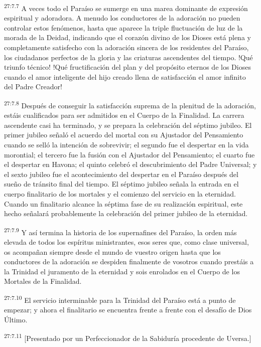 \par
\textsuperscript{27:7.7} A veces todo el Paraíso se sumerge en una marea dominante de expresión espiritual y adoradora. A menudo los conductores de la adoración no pueden controlar estos fenómenos, hasta que aparece la triple fluctuación de luz de la morada de la Deidad, indicando que el corazón divino de los Dioses está plena y completamente satisfecho con la adoración sincera de los residentes del Paraíso, los ciudadanos perfectos de la gloria y las criaturas ascendentes del tiempo. !Qué triunfo técnico! !Qué fructificación del plan y del propósito eternos de los Dioses cuando el amor inteligente del hijo creado llena de satisfacción el amor infinito del Padre Creador!

\par
\textsuperscript{27:7.8} Después de conseguir la satisfacción suprema de la plenitud de la adoración, estáis cualificados para ser admitidos en el Cuerpo de la Finalidad. La carrera ascendente casi ha terminado, y se prepara la celebración del séptimo jubileo. El primer jubileo señaló el acuerdo del mortal con su Ajustador del Pensamiento cuando se selló la intención de sobrevivir; el segundo fue el despertar en la vida morontial; el tercero fue la fusión con el Ajustador del Pensamiento; el cuarto fue el despertar en Havona; el quinto celebró el descubrimiento del Padre Universal; y el sexto jubileo fue el acontecimiento del despertar en el Paraíso después del sueño de tránsito final del tiempo. El séptimo jubileo señala la entrada en el cuerpo finalitario de los mortales y el comienzo del servicio en la eternidad. Cuando un finalitario alcance la séptima fase de su realización espiritual, este hecho señalará probablemente la celebración del primer jubileo de la eternidad.

\par
\textsuperscript{27:7.9} Y así termina la historia de los supernafines del Paraíso, la orden más elevada de todos los espíritus ministrantes, esos seres que, como clase universal, os acompañan siempre desde el mundo de vuestro origen hasta que los conductores de la adoración se despiden finalmente de vosotros cuando prestáis a la Trinidad el juramento de la eternidad y sois enrolados en el Cuerpo de los Mortales de la Finalidad.

\par
\textsuperscript{27:7.10} El servicio interminable para la Trinidad del Paraíso está a punto de empezar; y ahora el finalitario se encuentra frente a frente con el desafío de Dios Último.

\par
\textsuperscript{27:7.11} [Presentado por un Perfeccionador de la Sabiduría procedente de Uversa.]